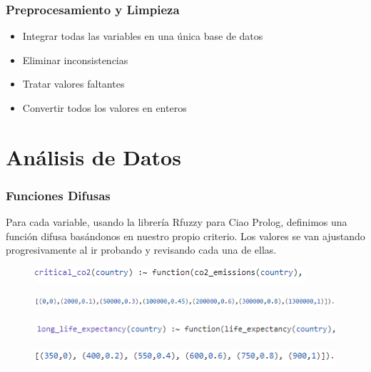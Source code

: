 \documentclass{beamer}
\newcommand{\slideauthor}[1]{\def\insertslideauthor{#1}}
\newcommand{\insertslideauthor}{}
\begin{document}
\begin{frame}
\frametitle{Preprocesamiento y Limpieza}
\slideauthor{Javier Comyn}
\begin{itemize}
    \item Integrar todas las variables en una única base de datos
    \item Eliminar inconsistencias
    \item Tratar valores faltantes
    \item Convertir todos los valores en enteros
\end{itemize}
\end{frame}

\section{Análisis de Datos}

\begin{frame}
\frametitle{Funciones Difusas}
\slideauthor{Javier Comyn}
Para cada variable, usando la librería Rfuzzy para Ciao Prolog, definimos una función difusa basándonos en nuestro propio criterio. Los valores se van ajustando progresivamente al ir probando y revisando cada una de ellas.
\vspace*{+5mm} %
\begin{figure}
\includegraphics[width=\textwidth]{Images/co2_1.png} 
\end{figure}
\vspace*{-5mm} %
\begin{figure}
\includegraphics[width=\textwidth]{Images/co2_2.png} 
\end{figure}
\begin{figure}
\includegraphics[width=\textwidth]{Images/lifeexp_1.png} 
\end{figure}
\vspace*{-5mm} %
\begin{figure}
\includegraphics[width=\textwidth]{Images/lifeexp_2.png} 
\end{figure}

\end{frame}
\end{document}
